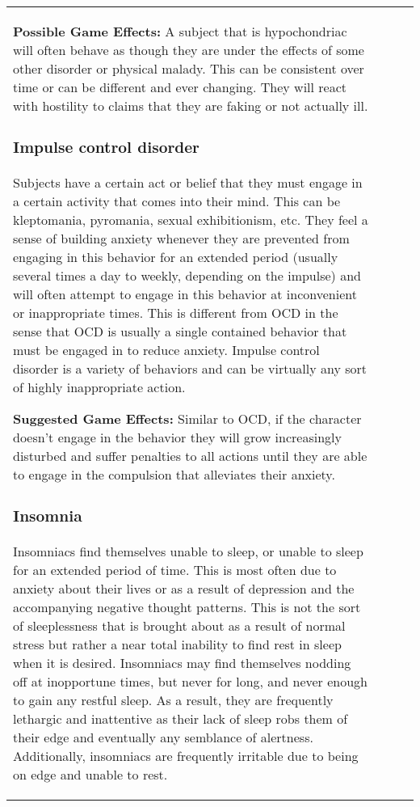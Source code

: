 \begin{table}
\begin{tabular}{|p{8cm}|r|r|r|}
\textbf{Possible Game Effects:} A subject that is hypochondriac will often behave as though they are under the effects of some other disorder or physical malady. This can be consistent over time or can be different and ever changing. They will react with hostility to claims that they are faking or not actually ill. 

\subsubsection{Impulse control disorder} 

Subjects have a certain act or belief that they must engage in a certain activity that comes into their mind. This can be kleptomania, pyromania, sexual exhibitionism, etc. They feel a sense of building anxiety whenever they are prevented from engaging in this behavior for an extended period (usually several times a day to weekly, depending on the impulse) and will often attempt to engage in this behavior at inconvenient or inappropriate times. This is different from OCD in the sense that OCD is usually a single contained behavior that must be engaged in to reduce anxiety. Impulse control disorder is a variety of behaviors and can be virtually any sort of highly inappropriate action. 

\textbf{Suggested Game Effects:} Similar to OCD, if the character doesn’t engage in the behavior they will grow increasingly disturbed and suffer penalties to all actions until they are able to engage in the compulsion that alleviates their anxiety. 

\subsubsection{Insomnia} 

Insomniacs find themselves unable to sleep, or unable to sleep for an extended period of time. This is most often due to anxiety about their lives or as a result of depression and the accompanying negative thought patterns. This is not the sort of sleeplessness that is brought about as a result of normal stress but rather a near total inability to find rest in sleep when it is desired. Insomniacs may find themselves nodding off at inopportune times, but never for long, and never enough to gain any restful sleep. As a result, they are frequently lethargic and inattentive as their lack of sleep robs them of their edge and eventually any semblance of alertness. Additionally, insomniacs are frequently irritable due to being on edge and unable to rest. 


\end{tabular}
\end{table}

